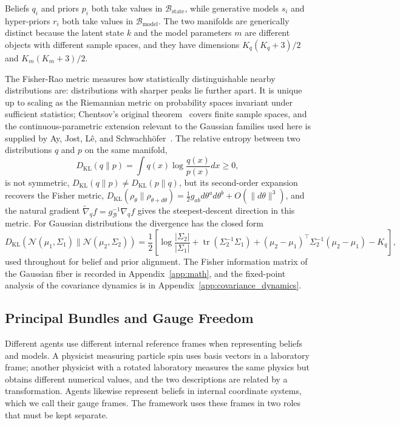 Beliefs $q_i$ and priors $p_i$ both take values in $\mathcal{B}_{\mathrm{state}}$, while generative models $s_i$ and hyper-priors $r_i$ both take values in $\mathcal{B}_{\mathrm{model}}$. The two manifolds are generically distinct because the latent state $k$ and the model parameters $m$ are different objects with different sample spaces, and they have dimensions $K_q(K_q+3)/2$ and $K_m(K_m+3)/2$.

The Fisher-Rao metric measures how statistically distinguishable nearby distributions are: distributions with sharper peaks lie further apart. It is unique up to scaling as the Riemannian metric on probability spaces invariant under sufficient statistics; Chentsov's original theorem~\cite{Cencov1982} covers finite sample spaces, and the continuous-parametric extension relevant to the Gaussian families used here is supplied by Ay, Jost, L\^{e}, and Schwachh\"{o}fer~\cite{AyJostLeSchwachhofer2017}. The relative entropy between two distributions $q$ and $p$ on the same manifold,
\begin{equation}
D_{\mathrm{KL}}(q \| p) = \int q(x) \log\frac{q(x)}{p(x)} dx \geq 0,
\end{equation}
is not symmetric, $D_{\mathrm{KL}}(q \| p) \neq D_{\mathrm{KL}}(p \| q)$, but its second-order expansion recovers the Fisher metric, $D_{\mathrm{KL}}(\rho_\theta \| \rho_{\theta+d\theta}) = \tfrac{1}{2} g_{ab} d\theta^a d\theta^b + O(\|d\theta\|^3)$, and the natural gradient $\tilde{\nabla}_q f = g^{-1}_{\mathcal{B}} \nabla_q f$ gives the steepest-descent direction in this metric. For Gaussian distributions the divergence has the closed form
\begin{equation}
D_{\mathrm{KL}}(\mathcal{N}(\mu_1, \Sigma_1) \| \mathcal{N}(\mu_2, \Sigma_2)) = \frac{1}{2}\left[\log\frac{|\Sigma_2|}{|\Sigma_1|} + \operatorname{tr}(\Sigma_2^{-1}\Sigma_1) + (\mu_2 - \mu_1)^\top\Sigma_2^{-1}(\mu_2 - \mu_1) - K_q\right],
\label{eq:gaussian_kl}
\end{equation}
used throughout for belief and prior alignment. The Fisher information matrix of the Gaussian fiber is recorded in Appendix~\ref{app:math}, and the fixed-point analysis of the covariance dynamics is in Appendix~\ref{app:covariance_dynamics}.

\subsection{Principal Bundles and Gauge Freedom}
\label{sec:agents_as_sections}

Different agents use different internal reference frames when representing beliefs and models. A physicist measuring particle spin uses basis vectors in a laboratory frame; another physicist with a rotated laboratory measures the same physics but obtains different numerical values, and the two descriptions are related by a transformation. Agents likewise represent beliefs in internal coordinate systems, which we call their gauge frames. The framework uses these frames in two roles that must be kept separate.

